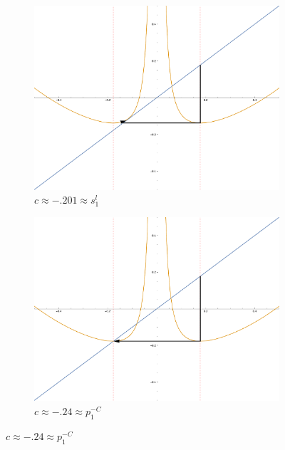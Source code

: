 \begin{figure}[ht]
		\begin{subfigure}[b]{0.3\textwidth}
				\includegraphics[width=\textwidth]{./img/plot-0201}
				\caption{$c \approx - .201\approx s_1^l$}
		\end{subfigure}
		\begin{subfigure}[b]{0.3\textwidth}
				\includegraphics[width=\textwidth]{./img/plot-024}
				\caption{$c \approx -.24 \approx p_1^{-C}$}
		\end{subfigure}

\end{figure}
